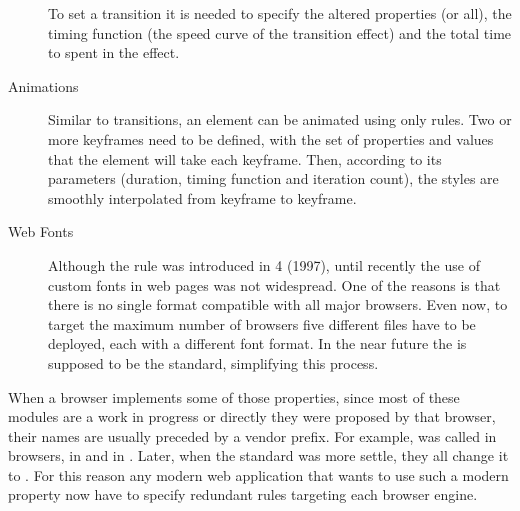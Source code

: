 \begin{description}
  To set a transition it is needed to specify the altered properties (or all), the timing function (the speed curve of the transition effect) and the total time to spent in the effect.
  \item[Animations] Similar to transitions, an element can be animated using only  rules.
  Two or more keyframes need to be defined, with the set of properties and values that the element will take each keyframe.
  Then, according to its parameters (duration, timing function and iteration count), the styles are smoothly interpolated from keyframe to keyframe.
  \item[Web Fonts] Although the  rule was introduced in 4 (1997), until recently the use of custom fonts in web pages was not widespread.
  One of the reasons is that there is no single format compatible with all major browsers.
  Even now, to target the maximum number of browsers five different files have to be deployed, each with a different font format.
  In the near future the  is supposed to be the standard, simplifying this process.
\end{description}

When a browser implements some of those properties, since most of these modules are a work in progress or directly they were proposed by that browser, their names are usually preceded by a vendor prefix.
For example,  was called  in  browsers,  in  and  in .
Later, when the standard was more settle, they all change it to .
For this reason any modern web application that wants to use such a modern property now have to specify redundant rules targeting each browser engine.

